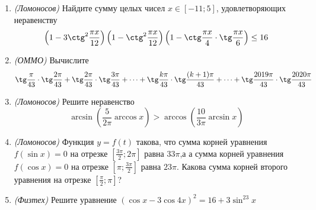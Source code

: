 


\clearpage
\pagestyle{empty}
\begin{enumerate}
    \item \textit{(Ломоносов)} Найдите сумму целых чисел $x\in[-11;5]$,
          удовлетворяющих неравенству
          \[\left(1-3\ctg^2\frac{\pi x}{12}\right)\left(1-\ctg^2\frac{\pi x}{12}\right)\left(1-\ctg\frac{\pi x}{4}\cdot\tg\frac{\pi x}{6}\right)\leq16\]
    \item \textit{(ОММО)} Вычислите
          \[\tg\frac{\pi}{43}\cdot\tg\frac{2\pi}{43}+\tg\frac{2\pi}{43}\cdot\tg\frac{3\pi}{43}+\cdots+\tg\frac{k\pi}{43}\cdot\tg\frac{(k+1)\pi}{43}+\cdots+\tg\frac{2019\pi}{43}\cdot\tg\frac{2020\pi}{43}\]
    \item \textit{(Ломоносов)} Решите неравенство
          \[\arcsin\left(\frac{5}{2\pi}\arccos x\right) > \arccos\left(\frac{10}{3\pi}\arcsin x\right)\]
    \item \textit{(Ломоносов)} Функция $y=f(t)$ такова, что сумма корней уравнения $f(\sin x)=0$ на отрезке $[\frac{3\pi}{2};2\pi]$ равна $33\pi$,а  а сумма корней уравнения $f(\cos x)=0$ на отрезке $[\pi;\frac{3\pi}{2}]$ равна $23\pi$. Какова сумма корней второго уравнения на отрезке $[\frac{\pi}{2};\pi]$?
    \item \textit{(Физтех)} Решите уравнение $(\cos x-3\cos 4x)^2=16+3\sin^23x$
\end{enumerate}
